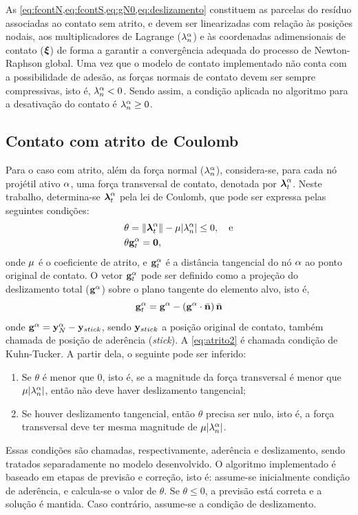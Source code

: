 \documentclass[Tese.tex]{subfiles}
\begin{document}
As \cref{eq:fcontN,eq:fcontS,eq:gN0,eq:deslizamento} constituem as parcelas do resíduo associadas ao contato sem atrito, e devem ser linearizadas com relação às posições nodais, aos multiplicadores de Lagrange ($\lambda_n^\alpha$) e às coordenadas adimensionais de contato ($\boldsymbol{\xi}$) de forma a garantir a convergência adequada do processo de Newton-Raphson global. Uma vez que o modelo de contato implementado não conta com a possibilidade de adesão, as forças normais de contato devem ser sempre compressivas, isto é, $\lambda_n^\alpha < 0$. Sendo assim, a condição aplicada no algoritmo para a desativação do contato é $\lambda_n^\alpha \geq 0$.

\subsection{Contato com atrito de Coulomb}

Para o caso com atrito, além da força normal ($\lambda_n^\alpha$), considera-se, para cada nó projétil ativo $\alpha$, uma força transversal de contato, denotada por $\boldsymbol{\lambda}_t^\alpha$. Neste trabalho, determina-se $\boldsymbol{\lambda}_t^\alpha$ pela lei de Coulomb, que pode ser expressa pelas seguintes condições:
\begin{align}
&\theta = \|\boldsymbol{\lambda}_t^\alpha\|-\mu|\lambda_n^\alpha| \leq 0, \text{\quad e}\\
&\theta\mathbf{g}_t^\alpha = \mathbf{0}, \label{eq:atrito2}
\end{align}
onde $\mu$ é o coeficiente de atrito, e $\mathbf{g}_t^\alpha$ é a distância tangencial do nó $\alpha$ ao ponto original de contato. O vetor $\mathbf{g}_t^\alpha$ pode ser definido como a projeção do deslizamento total ($\mathbf{g}^\alpha$) sobre o plano tangente do elemento alvo, isto é,
\begin{equation}\label{eq:gTnode}
\mathbf{g}_t^\alpha = \mathbf{g}^\alpha - \left(\mathbf{g}^\alpha\cdot\bar{\mathbf{n}}\right)\bar{\mathbf{n}}
\end{equation}
onde $\mathbf{g}^\alpha = \mathbf{y}_N^\alpha-\mathbf{y}_{stick}$, sendo $\mathbf{y}_{stick}$ a posição original de contato, também chamada de posição de aderência (\emph{stick}). A \cref{eq:atrito2} é chamada condição de Kuhn-Tucker. A partir dela, o seguinte pode ser inferido:
\begin{enumerate}
	\item Se $\theta$ é menor que 0, isto é, se a magnitude da força transversal é menor que $\mu|\lambda_n^\alpha|$, então não deve haver deslizamento tangencial;
	\item Se houver deslizamento tangencial, então $\theta$ precisa ser nulo, isto é, a força transversal deve ter mesma magnitude de $\mu|\lambda_n^\alpha|$.
\end{enumerate}
Essas condições são chamadas, respectivamente, aderência e deslizamento, sendo tratados separadamente no modelo desenvolvido. O algoritmo implementado é baseado em etapas de previsão e correção, isto é: assume-se inicialmente condição de aderência, e calcula-se o valor de $\theta$. Se $\theta \leq 0$, a previsão está correta e a solução é mantida. Caso contrário, assume-se a condição de deslizamento. 
\end{document}
